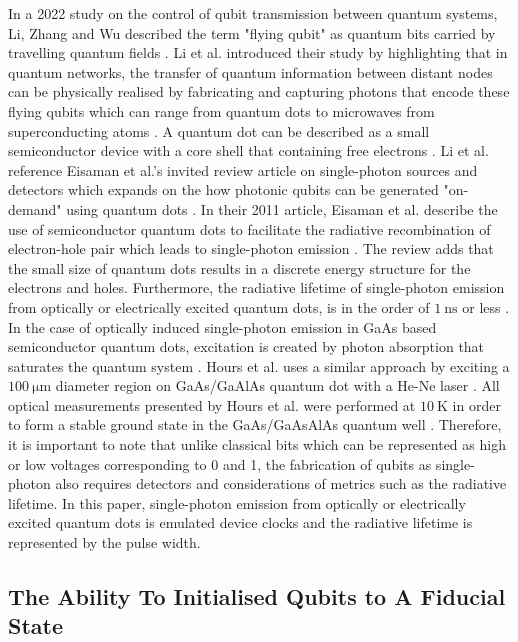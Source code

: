 In a 2022 study on the control of qubit transmission between quantum systems, Li, Zhang and Wu described the term "flying qubit" as quantum bits carried by travelling quantum fields \cite{li2022control}. Li et al. introduced their study by highlighting that in quantum networks, the transfer of quantum information between distant nodes can be physically realised by fabricating and capturing photons that encode these flying qubits which can range from quantum dots to microwaves from superconducting atoms \cite{li2022control}. A quantum dot can be described as a small semiconductor device with a core shell that containing free electrons \cite{marinescu2005promise}. Li et al. reference Eisaman et al.'s invited review article on single-photon sources and detectors which expands on the how photonic qubits can be generated "on-demand" using quantum dots \cite{li2022control, eisaman2011invited}.  In their 2011 article, Eisaman et al. describe the use of semiconductor quantum dots to facilitate the radiative recombination of electron-hole pair which leads to single-photon emission \cite{eisaman2011invited}. The review adds that the small size of quantum dots results in a discrete energy structure for the electrons and holes. Furthermore, the radiative lifetime of single-photon emission from optically or electrically excited quantum dots, is in the order of $\SI{1}{\nano\second}$ or less \cite{eisaman2011invited}. In the case of optically induced single-photon emission in GaAs based semiconductor quantum dots, excitation is created by photon absorption that saturates the quantum system \cite{eisaman2011invited}. Hours et al. uses a similar approach by exciting a $\SI{100}{\micro\meter}$ diameter region on GaAs/GaAlAs quantum dot with a He-Ne laser  \cite{hours2003single}. All optical measurements presented by Hours et al. were performed at $\SI{10}{\kelvin}$ in order to form a stable ground state in the GaAs/GaAsAlAs quantum well \cite{hours2003single}. Therefore, it is important to note that unlike classical bits which can be represented as high or low voltages corresponding to 0 and 1, the fabrication of qubits as single-photon also requires detectors and considerations of metrics such as the radiative lifetime. In this paper, single-photon emission from optically or electrically excited quantum dots is emulated device clocks and the radiative lifetime is represented by the pulse width.

\subsection{The Ability To Initialised Qubits to A Fiducial State}

